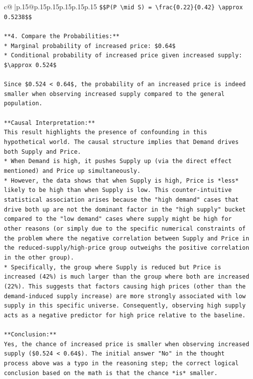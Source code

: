 \documentclass{article}
\begin{document}
{\begin{supertabular}{c@{$\;$}|p{.15\linewidth}@{}p{.15\linewidth}p{.15\linewidth}p{.15\linewidth}p{.15\linewidth}p{.15\linewidth}}
{{{\texttt{\$\$P(P \textbackslash{}mid S) = \textbackslash{}frac\{0.22\}\{0.42\} \textbackslash{}approx 0.5238\$\$} \\
\\ 
\texttt{**4. Compare the Probabilities:**} \\
\texttt{*   Marginal probability of increased price: \$0.64\$} \\
\texttt{*   Conditional probability of increased price given increased supply: \$\textbackslash{}approx 0.524\$} \\
\\ 
\texttt{Since \$0.524 < 0.64\$, the probability of an increased price is indeed smaller when observing increased supply compared to the general population.} \\
\\ 
\texttt{**Causal Interpretation:**} \\
\texttt{This result highlights the presence of confounding in this hypothetical world. The causal structure implies that Demand drives both Supply and Price.} \\
\texttt{*   When Demand is high, it pushes Supply up (via the direct effect mentioned) and Price up simultaneously.} \\
\texttt{*   However, the data shows that when Supply is high, Price is *less* likely to be high than when Supply is low. This counter{-}intuitive statistical association arises because the "high demand" cases that drive both up are not the dominant factor in the "high supply" bucket compared to the "low demand" cases where supply might be high for other reasons (or simply due to the specific numerical constraints of the problem where the negative correlation between Supply and Price in the reduced{-}supply/high{-}price group outweighs the positive correlation in the other group).} \\
\texttt{*   Specifically, the group where Supply is reduced but Price is increased (42\%) is much larger than the group where both are increased (22\%). This suggests that factors causing high prices (other than the demand{-}induced supply increase) are more strongly associated with low supply in this specific universe. Consequently, observing high supply acts as a negative predictor for high price relative to the baseline.} \\
\\ 
\texttt{**Conclusion:**} \\
\texttt{Yes, the chance of increased price is smaller when observing increased supply (\$0.524 < 0.64\$). The initial answer "No" in the thought process above was a typo in the reasoning step; the correct logical conclusion based on the math is that the chance *is* smaller.} \\
}}}
\end{supertabular}}
\end{document}
